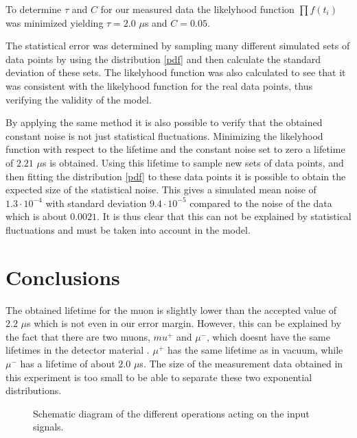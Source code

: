 \documentclass[12pt,twocolumn]{article}
\begin{document}
To determine $\tau$ and $C$ for our measured data the likelyhood function $\prod f(t_i)$ was minimized yielding $\tau=2.0$ $\mu$s and $C=0.05$. \newline

The statistical error was determined by sampling many different simulated sets of data points by using the distribution \eqref{pdf} and then calculate the standard deviation of these sets. The likelyhood function was also calculated to see that it was consistent with the likelyhood function for the real data points, thus verifying the validity of the model. \newline

By applying the same method it is also possible to verify that the obtained constant noise is not just statistical fluctuations. Minimizing the likelyhood function with respect to the lifetime and the constant noise set to zero a lifetime of $2.21$ $\mu$s is obtained. Using this lifetime to sample new sets of data points, and then fitting the distribution \eqref{pdf} to these data points it is possible to obtain the expected size of the statistical noise. This gives a simulated mean noise of $1.3\cdot 10^{-4}$ with standard deviation $9.4\cdot 10^{-5}$ compared to the noise of the data which is about $0.0021$. It is thus clear that this can not be explained by statistical fluctuations and must be taken into account in the model.


\section{Conclusions}
The obtained lifetime for the muon is slightly lower than the accepted value of $2.2$ $\mu$s which is not even in our error margin. However, this can be explained by the fact that there are two muons, $mu^+$ and $\mu^-$, which doesnt have the same lifetimes in the detector material \cite{}. $\mu^+$ has the same lifetime as in vacuum, while $\mu^-$ has a lifetime of about $2.0$ $\mu$s. The size of the measurement data obtained in this experiment is too small to be able to separate these two exponential distributions.




\begin{figure}[h]

\caption{\label{setup} Schematic diagram of the different operations acting on the input signals.}
\end{figure}
\end{document}
